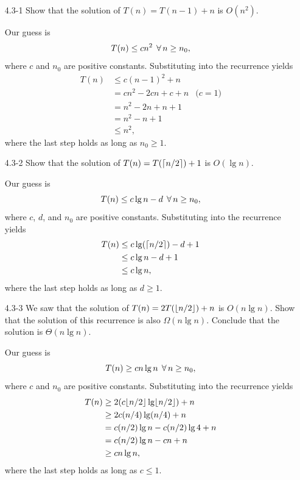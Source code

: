 \begin{enumerate}

\item[4.3{-}1]{Show that the solution of $T(n) = T(n - 1) + n$ is $O(n^2)$.}

\begin{framed}
Our guess is
\[
T(n) \le cn^2 \; \operatorname{\forall} n \ge n_0,
\]
where $c$ and $n_0$ are positive constants. Substituting into the recurrence
yields
\begin{equation*}
\begin{aligned}
T(n) &\le c (n - 1)^2 + n\\
     &= cn^2 - 2cn + c + n & \text{($c = 1$)}\\
     &= n^2 - 2n + n + 1\\
     &= n^2 - n + 1\\
     &\le n^2,
\end{aligned}
\end{equation*}
where the last step holds as long as $n_0 \ge 1$.

\end{framed}

\item[4.3{-}2]{Show that the solution of $T(n) = T(\lceil n/2\rceil) + 1$ is
$O(\lg n)$.}

\begin{framed}
Our guess is
\[
T(n) \le c \lg n - d \; \operatorname{\forall} n \ge n_0,
\]
where $c$, $d$, and $n_0$ are positive constants. Substituting into the
recurrence yields
\begin{equation*}
\begin{aligned}
T(n) &\le c \lg(\lceil n/2\rceil) - d + 1\\
     &\le c \lg n - d + 1\\
     &\le c \lg n,
\end{aligned}
\end{equation*}
where the last step holds as long as $d \ge 1$.
\end{framed}

\item[4.3{-}3]{We saw that the solution of $T(n) = 2T(\lfloor n/2\rfloor) + n$ is
$O(n \lg n)$. Show that the solution of this recurrence is also
$\Omega(n \lg n)$. Conclude that the solution is $\Theta(n \lg n)$.}

\begin{framed}
Our guess is
\[
T(n) \ge c n \lg n \; \operatorname{\forall} n \ge n_0,
\]
where $c$ and $n_0$ are positive constants. Substituting into the
recurrence yields
\begin{equation*}
\begin{aligned}
T(n) &\ge 2(c \lfloor n/2\rfloor \lg\lfloor n/2\rfloor) + n\\
     &\ge 2 c (n/4) \lg(n/4) + n\\
     &=   c (n/2) \lg n - c (n/2) \lg 4 + n\\
     &=   c (n/2) \lg n - c n + n\\
     &\ge c n \lg n,
\end{aligned}
\end{equation*}
where the last step holds as long as $c \le 1$.


\end{framed}
\end{enumerate}

